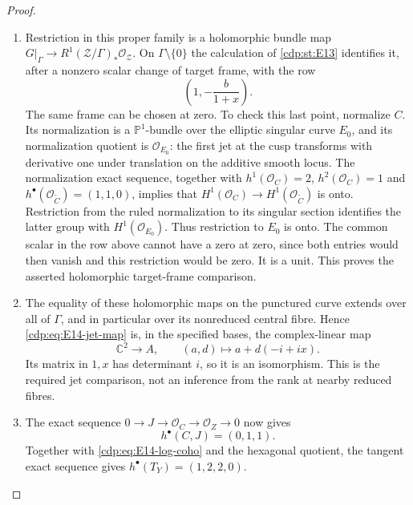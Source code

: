 \begin{proof}
\begin{enumerate}[label={$\langle1\rangle$\arabic*.},leftmargin=*]
\item Restriction in this proper family is a holomorphic bundle map
$G|_\Gamma\to R^1(\mathcal Z/\Gamma)_*\mathcal O_{\mathcal Z}$.
On $\Gamma\setminus\{0\}$ the calculation of \ref{cdp:st:E13} identifies it,
after a nonzero scalar change of target frame, with the row
\[
 \left(1,-\frac{b}{1+x}\right).
\]
The same frame can be chosen at zero. To check this last point,
normalize $C$. Its normalization is a $\mathbb P^1$-bundle over
the elliptic singular curve $E_0$, and its normalization quotient
is $\mathcal O_{E_0}$: the first jet at the cusp transforms with
derivative one under translation on the additive smooth locus.
The normalization exact sequence, together with
$h^1(\mathcal O_C)=2$, $h^2(\mathcal O_C)=1$ and
$h^\bullet(\mathcal O_{\widetilde C})=(1,1,0)$, implies
that $H^1(\mathcal O_C)\to H^1(\mathcal O_{\widetilde C})$
is onto. Restriction from the ruled normalization to its singular
section identifies the latter group with $H^1(\mathcal O_{E_0})$.
Thus restriction to $E_0$ is onto. The common scalar in the row
above cannot have a zero at zero, since both entries would then
vanish and this restriction would be zero. It is a unit. This
proves the asserted holomorphic target-frame comparison.

\item The equality of these holomorphic maps on the punctured curve
extends over all of $\Gamma$, and in particular over its
nonreduced central fibre. Hence \eqref{cdp:eq:E14-jet-map} is,
in the specified bases, the complex-linear map
\[
 \mathbb C^2\longrightarrow A,\qquad
 (a,d)\longmapsto a+d(-i+ix).
\]
Its matrix in $1,x$ has determinant $i$, so it is an isomorphism.
This is the required jet comparison, not an inference from the
rank at nearby reduced fibres.

\item The exact sequence $0\to J\to\mathcal O_C\to\mathcal O_Z\to0$
now gives
\[
 h^\bullet(C,J)=(0,1,1).
\]
Together with \eqref{cdp:eq:E14-log-coho} and the hexagonal quotient,
the tangent exact sequence gives
$h^\bullet(T_Y)=(1,2,2,0)$.


\end{enumerate}
\end{proof}
